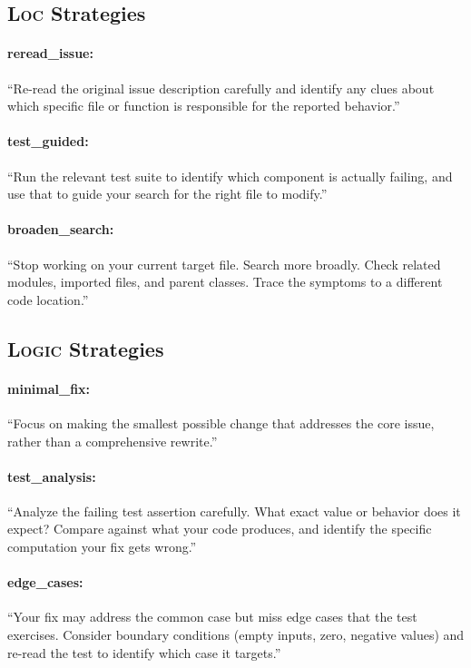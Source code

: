 \documentclass{article}
\begin{document}
\subsection{\textsc{Loc} Strategies}

\paragraph{reread\_issue:} ``Re-read the original issue description carefully and identify any clues about which specific file or function is responsible for the reported behavior.''

\paragraph{test\_guided:} ``Run the relevant test suite to identify which component is actually failing, and use that to guide your search for the right file to modify.''

\paragraph{broaden\_search:} ``Stop working on your current target file. Search more broadly. Check related modules, imported files, and parent classes. Trace the symptoms to a different code location.''

\subsection{\textsc{Logic} Strategies}

\paragraph{minimal\_fix:} ``Focus on making the smallest possible change that addresses the core issue, rather than a comprehensive rewrite.''

\paragraph{test\_analysis:} ``Analyze the failing test assertion carefully. What exact value or behavior does it expect? Compare against what your code produces, and identify the specific computation your fix gets wrong.''

\paragraph{edge\_cases:} ``Your fix may address the common case but miss edge cases that the test exercises. Consider boundary conditions (empty inputs, zero, negative values) and re-read the test to identify which case it targets.''
\end{document}
